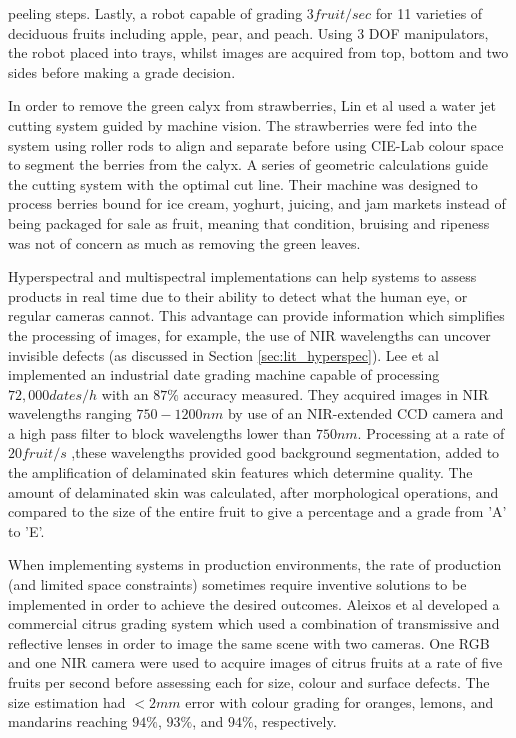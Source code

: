 \documentclass[fleqn,twoside,12pt]{report}
\begin{document}
peeling steps. Lastly, a robot capable of grading $3 fruit/sec$ for 11 varieties of deciduous fruits including apple, pear, and peach. Using 3 DOF manipulators, the robot placed into trays, whilst images are acquired from top, bottom and two sides before making a grade decision. 


In order to remove the green calyx from strawberries, Lin et al \cite{lin} used a water jet cutting system guided by machine vision. The strawberries were fed into the system using roller rods to align and separate before using CIE-Lab colour space to segment the berries from the calyx. A series of geometric calculations guide the cutting system with the optimal cut line. Their machine was designed to process berries bound for ice cream, yoghurt, juicing, and jam markets instead of being packaged for sale as fruit, meaning that condition, bruising and ripeness was not of concern as much as removing the green leaves.

Hyperspectral and multispectral implementations can help systems to assess products in real time due to their ability to detect what the human eye, or regular cameras cannot. This advantage can provide information which simplifies the processing of images, for example, the use of NIR wavelengths can uncover invisible defects (as discussed in Section \ref{sec:lit_hyperspec}). Lee et al \cite{lee} implemented an industrial date grading machine capable of processing $72,000 dates/h$ with an $87\%$ accuracy measured. They acquired images in NIR wavelengths ranging $750-1200nm$ by use of an NIR-extended CCD camera and a high pass filter to block wavelengths lower than $750nm$. Processing at a rate of $20 fruit/s$ ,these wavelengths provided good background segmentation, added to the amplification of delaminated skin features which determine quality. The amount of delaminated skin was calculated, after morphological operations, and compared to the size of the entire fruit to give a percentage and a grade from 'A' to 'E'. 

When implementing systems in production environments, the rate of production (and limited space constraints) sometimes require inventive solutions to be implemented in order to achieve the desired outcomes. Aleixos et al \cite{aleixos} developed a commercial citrus grading system which used a combination of transmissive and reflective lenses in order to image the same scene with two cameras. One RGB and one NIR camera were used to acquire images of citrus fruits at a rate of five fruits per second before assessing each for size, colour and surface defects. The size estimation had $<2mm$ error with colour grading for oranges, lemons, and mandarins reaching $94\%$, $93\%$, and $94\%$, respectively.
\end{document}
